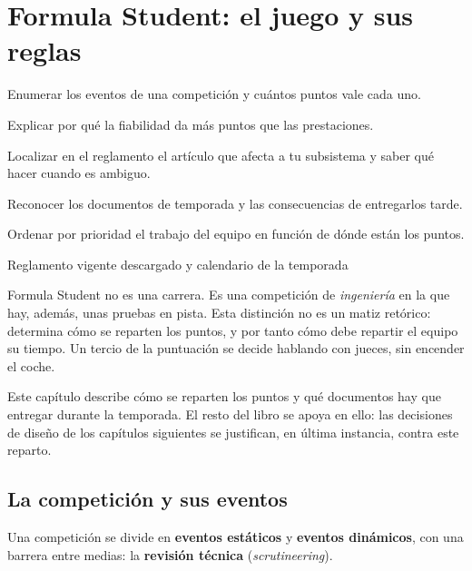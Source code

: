 \chapter{Formula Student: el juego y sus reglas}
\label{ch:formula_student}

\begin{objetivos}
  \item Enumerar los eventos de una competición y cuántos puntos vale cada uno.
  \item Explicar por qué la fiabilidad da más puntos que las prestaciones.
  \item Localizar en el reglamento el artículo que afecta a tu subsistema y saber
        qué hacer cuando es ambiguo.
  \item Reconocer los documentos de temporada y las consecuencias de entregarlos tarde.
  \item Ordenar por prioridad el trabajo del equipo en función de dónde están los puntos.
\end{objetivos}

%
{Reglamento vigente descargado y calendario de la temporada}

Formula Student no es una carrera. Es una competición de \emph{ingeniería} en la
que hay, además, unas pruebas en pista. Esta distinción no es un matiz retórico:
determina cómo se reparten los puntos, y por tanto cómo debe repartir el equipo
su tiempo. Un tercio de la puntuación se decide hablando con jueces, sin
encender el coche.

Este capítulo describe cómo se reparten los puntos y qué documentos hay que
entregar durante la temporada. El resto del libro se apoya en ello: las
decisiones de diseño de los capítulos siguientes se justifican, en última
instancia, contra este reparto.

\section{La competición y sus eventos}
\label{sec:formula_student:01}

Una competición se divide en \textbf{eventos estáticos} y \textbf{eventos
dinámicos}, con una barrera entre medias: la \textbf{revisión técnica}
(\emph{scrutineering}).

